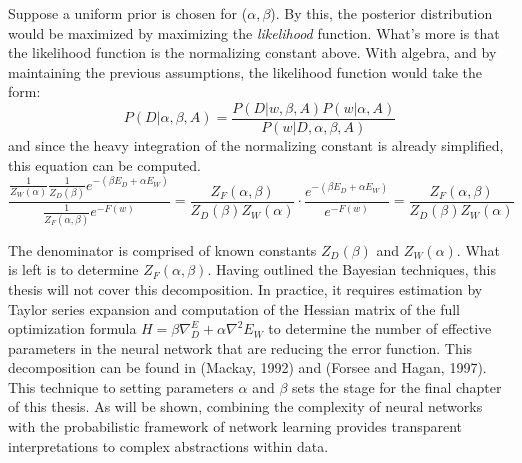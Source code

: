 Suppose a uniform prior is chosen for ($\alpha,\beta$).  By this, the posterior distribution would be maximized by maximizing the \textit{likelihood} function.  What's more is that the likelihood function is the normalizing constant above.  With algebra, and by maintaining the previous assumptions, the likelihood function would take the form:
$$
P(D|\alpha,\beta,A) = \frac{P(D|w,\beta,A) P(w|\alpha,A)}{P(w|D,\alpha,\beta,A)}
$$
and since the heavy integration of the normalizing constant is already simplified, this equation can be computed.
$$
\frac{\frac{1}{Z_W(\alpha)} \frac{1}{Z_D(\beta)} e^{-(\beta E_D + \alpha E_W)}}{\frac{1}{Z_F(\alpha,\beta)} e^{-F(w)}} = \frac{Z_F(\alpha,\beta)}{Z_D(\beta) Z_W(\alpha)} \cdot \frac{e^{-(\beta E_D + \alpha E_W)}}{e^{-F(w)}} = \frac{Z_F(\alpha,\beta)}{Z_D(\beta) Z_W(\alpha)}
$$

The denominator is comprised of known constants $Z_D(\beta)$ and $Z_W(\alpha)$.  What is left is to determine $Z_F(\alpha,\beta)$.  Having outlined the Bayesian techniques, this thesis will not cover this decomposition.  In practice, it requires estimation by Taylor series expansion and computation of the Hessian matrix of the full optimization formula $H = \beta \nabla^ E_D + \alpha \nabla^2 E_W$ to determine the number of effective parameters in the neural network that are reducing the error function.  This decomposition can be found in (Mackay, 1992) and (Forsee and Hagan, 1997).  This technique to setting parameters $\alpha$ and $\beta$ sets the stage for the final chapter of this thesis. As will be shown, combining the complexity of neural networks with the probabilistic framework of network learning provides transparent interpretations to complex abstractions within data.


\begin{comment}
Through \textbf{margialization}, the true posterior $P(w|D,A)$ is obtained by integrating out $\alpha$ and $\beta$:
$$
P(w|D,A) = \int P(w|D,\alpha,\beta,A) P(\alpha, \beta | D,A) \text{ } d\alpha \text{ } d\beta
$$
\end{comment}
